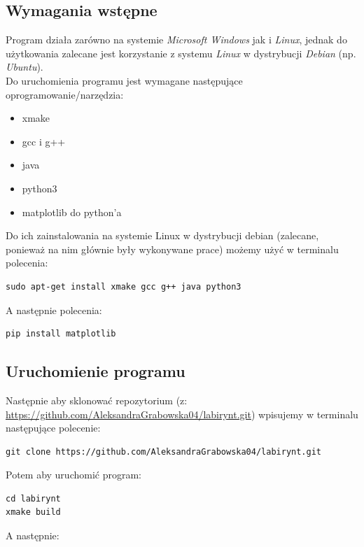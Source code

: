 \documentclass{article}
\begin{document}
\subsection{Wymagania wstępne}

Program działa zarówno na systemie \textit{Microsoft Windows} jak i \textit{Linux}, jednak do użytkowania zalecane jest korzystanie z systemu \textit{Linux} w dystrybucji \textit{Debian} (np. \textit{Ubuntu}). \\

Do uruchomienia programu jest wymagane następujące oprogramowanie/narzędzia:
\begin{itemize}
    \item xmake
    \item gcc i g++
    \item java
    \item python3
    \item matplotlib do python’a
\end{itemize}

Do ich zainstalowania na systemie Linux w dystrybucji debian (zalecane, ponieważ na nim głównie były wykonywane prace) możemy użyć w terminalu polecenia:

\begin{lstlisting}
sudo apt-get install xmake gcc g++ java python3
\end{lstlisting}

A następnie polecenia:

\begin{lstlisting}
pip install matplotlib
\end{lstlisting}

\subsection{Uruchomienie programu}

Następnie aby sklonować repozytorium (z: \url{https://github.com/AleksandraGrabowska04/labirynt.git}) wpisujemy w terminalu następujące polecenie:

\begin{lstlisting}
git clone https://github.com/AleksandraGrabowska04/labirynt.git
\end{lstlisting}

Potem aby uruchomić program:

\begin{lstlisting}
cd labirynt
xmake build
\end{lstlisting}

A następnie:
\end{document}
